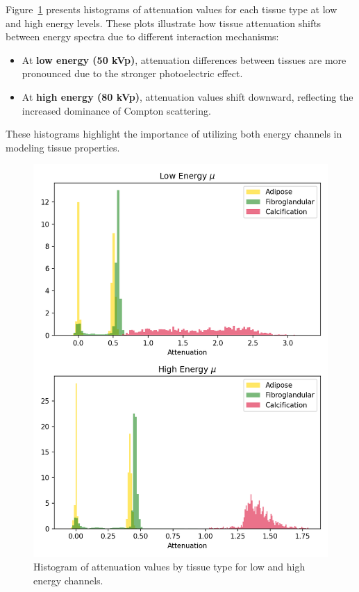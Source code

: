 Figure~\ref{fig:histograms} presents histograms of attenuation values for each tissue type at low and high energy levels.
These plots illustrate how tissue attenuation shifts between energy spectra due to different interaction mechanisms:

\begin{itemize}
    \item At \textbf{low energy (50 kVp)}, attenuation differences between tissues are more pronounced due to the stronger photoelectric effect.
    \item At \textbf{high energy (80 kVp)}, attenuation values shift downward, reflecting the increased dominance of Compton scattering.
\end{itemize}

These histograms highlight the importance of utilizing both energy channels in modeling tissue properties.

\begin{figure}[h!]
    \centering
    \includegraphics[width=\linewidth]{./fig/attenuation_histograms.png}
    \caption{Histogram of attenuation values by tissue type for low and high energy channels.}
    \label{fig:histograms}
\end{figure}

